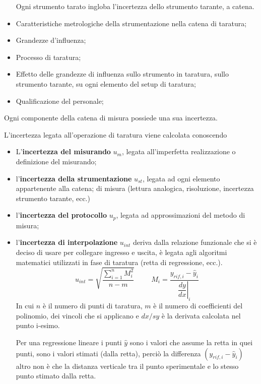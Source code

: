 \documentclass[a4paper, 15pt]{article}
\begin{document}
\begin{adjustwidth}{2in}{}
\begin{itemize}
   			Ogni strumento tarato ingloba l'incertezza dello strumento tarante, a catena.
   			\item Caratteristiche metrologiche della strumentazione nella catena di taratura;
   			\item Grandezze d'influenza; 
   			\item Processo di taratura;
   			\item Effetto delle grandezze di influenza sullo strumento in taratura, sullo strumento
   			tarante, su ogni elemento del setup di taratura;
   			\item Qualificazione del personale;
   		\end{itemize}
   		Ogni componente della catena di misura possiede una sua incertezza. 
   		\newline 
   		
   		L'incertezza legata all'operazione di taratura viene calcolata conoscendo 
   		\begin{itemize}
   			\item L'\textbf{incertezza del misurando} $u_m$, legata all'imperfetta realizzazione o definizione del misurando;
   			\item l'\textbf{incertezza della strumentazione} $u_{st}$, legata ad ogni elemento appartenente alla catena;
   			di misura (lettura analogica, risoluzione, incertezza strumento tarante, ecc.)
   			\item l'\textbf{incertezza del protocollo} $u_p$, legata ad approssimazioni del metodo di misura;
   			\item l'\textbf{incertezza di interpolazione} $u_{int}$ deriva dalla relazione funzionale che si è deciso di usare per collegare ingresso e uscita, è legata agli algoritmi matematici utilizzati in
   			fase di taratura (retta di regressione, ecc.).
   			\[u_{int} = \sqrt{\dfrac{\sum_{i=1}^{n}M_i^2}{n-m}} \hspace{1cm} M_i = \dfrac{y_{rif, i}-\hat{y}_i}{\left.\dfrac{dy}{dx}\right|_i}\]
   			In cui $n$ è il numero di punti di taratura, $m$ è il numero di coefficienti del polinomio, dei vincoli che si applicano e $dx/sy$ è la derivata calcolata nel punto i-esimo. \newline 
   			
   			Per una regressione lineare i punti $\hat{y}$ sono i valori che assume la retta in quei punti, sono i valori stimati (dalla retta), perciò la differenza $ (y_{rif, i}-\hat{y}_i) $ altro non è che la distanza verticale tra il punto sperimentale e lo stesso punto stimato dalla retta. 
   			

\end{itemize}
\end{adjustwidth}
\end{document}
